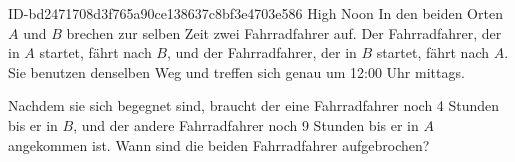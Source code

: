 \begin{exercise}
      {ID-bd2471708d3f765a90ce138637c8bf3e4703e586}
      {High Noon}
  \ifproblem\problem
    In den beiden Orten $A$ und $B$ brechen zur selben Zeit zwei Fahrradfahrer auf.
    Der Fahrradfahrer, der in $A$ startet, fährt nach $B$, und der Fahrradfahrer, der
    in $B$ startet, fährt nach $A$. Sie benutzen denselben Weg und treffen sich genau um
    12:00 Uhr mittags.
    \begin{center}
    \end{center}
    Nachdem sie sich begegnet sind, braucht der eine Fahrradfahrer noch 4
    Stunden bis er in $B$, und der andere Fahrradfahrer noch 9 Stunden bis
    er in $A$ angekommen ist. Wann sind die beiden Fahrradfahrer aufgebrochen?
  \fi
\end{exercise}
